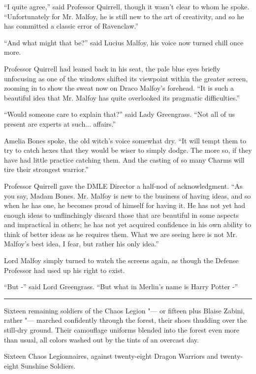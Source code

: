 ``I quite agree,'' said Professor Quirrell, though it wasn't clear to
whom he spoke. ``Unfortunately for Mr. Malfoy, he is still new to the
art of creativity, and so he has committed a classic error of
Ravenclaw.''

``And what might that be?'' said Lucius Malfoy, his voice now turned
chill once more.

Professor Quirrell had leaned back in his seat, the pale blue eyes
briefly unfocusing as one of the windows shifted its viewpoint within
the greater screen, zooming in to show the sweat now on Draco Malfoy's
forehead. ``It is such a beautiful idea that Mr. Malfoy has quite
overlooked its pragmatic difficulties.''

``Would someone care to explain that?'' said Lady Greengrass. ``Not all
of us present are experts at such... affairs.''

Amelia Bones spoke, the old witch's voice somewhat dry. ``It will tempt
them to try to catch hexes that they would be wiser to simply dodge. The
more so, if they have had little practice catching them. And the casting
of so many Charms will tire their strongest warrior.''

Professor Quirrell gave the DMLE Director a half-nod of acknowledgment.
``As you say, Madam Bones. Mr. Malfoy is new to the business of having
ideas, and so when he has one, he becomes proud of himself for having
it. He has not yet had enough ideas to unflinchingly discard those that
are beautiful in some aspects and impractical in others; he has not yet
acquired confidence in his own ability to think of better ideas as he
requires them. What we are seeing here is not Mr. Malfoy's best idea, I
fear, but rather his only idea.''

Lord Malfoy simply turned to watch the screens again, as though the
Defense Professor had used up his right to exist.

``But -'' said Lord Greengrass. ``But what in Merlin's name is Harry
Potter -''

\begin{center}\rule{3in}{0.4pt}\end{center}

Sixteen remaining soldiers of the Chaos Legion "--- or fifteen plus Blaise
Zabini, rather "--- marched confidently through the forest, their shoes
thudding over the still-dry ground. Their camouflage uniforms blended
into the forest even more than usual, all colors washed out by the tints
of an overcast day.

Sixteen Chaos Legionnaires, against twenty-eight Dragon Warriors and
twenty-eight Sunshine Soldiers.

